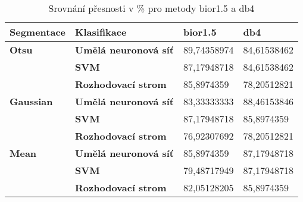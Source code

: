 \capstartfalse
\begin{table}[!htbp]
\begin{tabular}{|l|l|l|l|}
\hline
\textbf{Segmentace} & \textbf{Klasifikace}         & \textbf{bior1.5} & \textbf{db4} \\ \hline
\textbf{Otsu}       & \textbf{Umělá neuronová síť} & 89,74358974      & 84,61538462  \\ \hline
\textbf{}           & \textbf{SVM}                 & 87,17948718      & 84,61538462  \\ \hline
\textbf{}           & \textbf{Rozhodovací strom}   & 85,8974359       & 78,20512821  \\ \hline
\textbf{Gaussian}   & \textbf{Umělá neuronová síť} & 83,33333333      & 88,46153846  \\ \hline
\textbf{}           & \textbf{SVM}                 & 87,17948718      & 85,8974359   \\ \hline
\textbf{}           & \textbf{Rozhodovací strom}   & 76,92307692      & 78,20512821  \\ \hline
\textbf{Mean}       & \textbf{Umělá neuronová síť} & 85,8974359       & 87,17948718  \\ \hline
\textbf{}           & \textbf{SVM}                 & 79,48717949      & 87,17948718  \\ \hline
\textbf{}           & \textbf{Rozhodovací strom}   & 82,05128205      & 85,8974359   \\ \hline
\end{tabular}
\caption{Srovnání přesnosti v \% pro metody bior1.5 a db4 }
\end{table}
\capstarttrue



